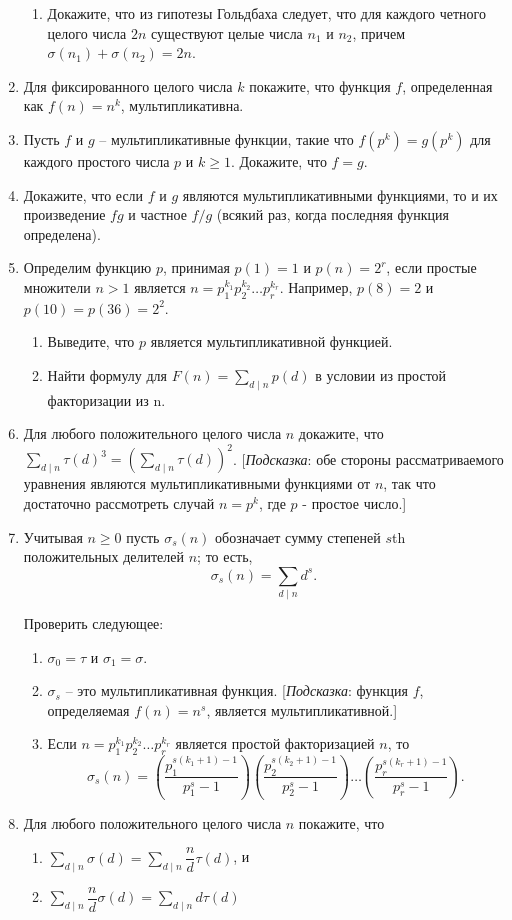 \documentclass[11pt]{article}
\begin{document}
\begin{enumerate}
\begin{enumerate}
			\item Докажите, что из гипотезы Гольдбаха следует, что для каждого четного целого числа $2n$ существуют целые числа $n_{1}$ и $n_{2}$, причем $\sigma (n_{1}) + \sigma (n_{2}) = 2n $.
		\end{enumerate}
		\item Для фиксированного целого числа $k$ покажите, что функция $f$, определенная как
		$f(n)=n^{k}$, мультипликативна.
		\item Пусть $f$ и $g$ -- мультипликативные функции, такие что $f(p^{k})=g(p^{k}) $ для каждого простого числа $p$ и $k\ge 1.$ Докажите, что $f = g$.
		\item Докажите, что если $f$ и $g$ являются мультипликативными функциями, то и их произведение $fg$ и частное $f/g$ (всякий раз, когда последняя функция определена).
		\item Определим функцию $p$, принимая $p(1)=1$ и $p(n)=2^{r}$, если простые множители $n > 1$ является $n = p_{1}^{k_{1}}p_{2}^{k_{2}}\ldots p_{r}^{k_{r}}$. Например, $p(8) = 2$ и $p(10) = p(36) = 2^{2}$.
		\begin{enumerate} 
			\item Выведите, что $p$ является мультипликативной функцией.
			\item Найти формулу для $F(n) = \sum_{d\mid n}p(d)$ в условии из простой факторизации из n.
		\end{enumerate}
		\item Для любого положительного целого числа $n$ докажите, что $\sum_{d\mid n} \tau(d)^{3} = \left(\sum_{d\mid n}\tau(d)\right)^{2}$. [{\itshape Подсказка}: обе стороны рассматриваемого уравнения являются мультипликативными функциями от $n$, так что достаточно рассмотреть случай $n=p^{k}$, где $p$ - простое число.]
		\item Учитывая $n\ge 0$ пусть $\sigma_{s}(n)$ обозначает сумму степеней $s$th положительных делителей $n$; то есть, \[\sigma_{s}(n)=\sum_{d\mid n}d^{s}.\]
		
		Проверить следующее:
		\begin{enumerate} 
			\item $\sigma_{0} = \tau$ и $\sigma_{1}=\sigma$.
			\item $\sigma_{s}$ -- это мультипликативная функция. [{\itshape Подсказка}: функция $f$, определяемая $f(n)=n^{s}$, является мультипликативной.]
			\item Если $n = p_{1}^{k_{1}}p_{2}^{k_{2}}\ldots p_{r}^{k_{r}}$ является простой факторизацией $n$, то \[\sigma_{s}(n)=\left(\frac{p_{1}^{s(k_{1}+1)-1}}{p_{1}^{s}-1}\right)\left(\frac{p_{2}^{s(k_{2}+1)-1}}{p_{2}^{s}-1}\right)\ldots \left(\frac{p_{r}^{s(k_{r}+1)-1}}{p_{r}^{s}-1}\right).\]
		\end{enumerate}
		\item Для любого положительного целого числа $n$ покажите, что
		\begin{enumerate} 
			\item $\sum \limits_{d\mid n}\sigma(d)=\sum \limits_{d\mid n}\dfrac{n}{d}\tau(d)$, и
			\setlength{\parskip}{2mm}
			\item $\sum \limits_{d\mid n}\dfrac{n}{d}\sigma(d)= \sum \limits_{d\mid n}d\tau(d)$
			

\end{enumerate}
\end{enumerate}
\end{document}
